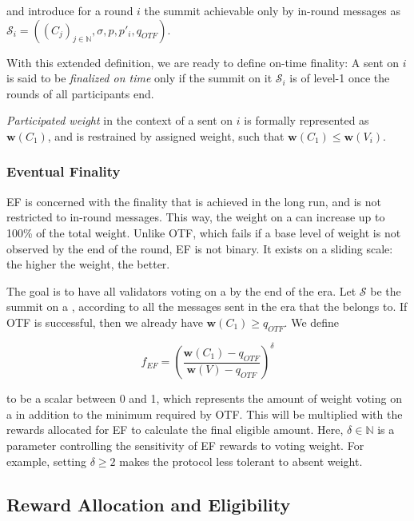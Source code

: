 and introduce for a round $i$ the summit achievable only by in-round messages as $\mathcal{S}_i=((C_j)_{j\in\mathbb{N}}, \sigma,p,p'_{i},q_{OTF})$.

With this extended definition, we are ready to define on-time finality: A \PROP sent on $i$ is said to be \emph{finalized on time} only if the summit on it $\mathcal{S}_i$ is of level-1 once the rounds of all participants end.

\emph{Participated weight} in the context of a \PROP sent on $i$ is formally represented as $\boldsymbol{w}(C_1)$, and is restrained by assigned weight, such that $\boldsymbol{w}(C_1) \leq \boldsymbol{w}(V_i)$.

\subsubsection*{Eventual Finality}
\label{sec:eventual-finality}

EF is concerned with the finality that is achieved in the long run, and is not restricted to in-round messages. This way, the weight on a \PROP can increase up to 100\% of the total weight. Unlike OTF, which fails if a base level of weight is not observed by the end of the round, EF is not binary. It exists on a sliding scale: the higher the weight, the better.

The goal is to have all validators voting on a \PROP by the end of the era. Let $\mathcal{S}$ be the summit on a \PROP, according to all the messages sent in the era that the \PROP belongs to. If OTF is successful, then we already have $\boldsymbol{w}(C_1)\geq q_{OTF}$. We define

\begin{equation}
f_{EF} = \left(\frac{\boldsymbol{w}(C_1) - q_{OTF}}{\boldsymbol{w}(V)-q_{OTF}}\right)^\delta
\end{equation}

to be a scalar between 0 and 1, which represents the amount of weight voting on a \PROP in addition to the minimum required by OTF. This will be multiplied with the rewards allocated for EF to calculate the final eligible amount. Here, $\delta \in \mathbb{N}$ is a parameter controlling the sensitivity of EF rewards to voting weight. For example, setting $\delta \geq 2$ makes the protocol less tolerant to absent weight.

\subsection{Reward Allocation and Eligibility}
\label{sec:reward-allocation-eligibility}

